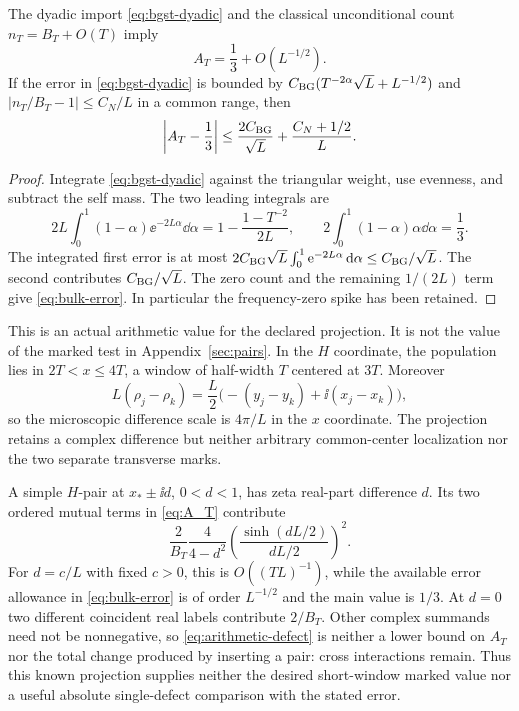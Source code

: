 \begin{proposition}\label{prop:bulk-value}
The dyadic import \eqref{eq:bgst-dyadic} and the classical
unconditional count $n_T=B_T+O(T)$ imply
\begin{equation}\label{eq:bulk-value}
 A_T=\frac13+O(L^{-1/2}).
\end{equation}
If the error in \eqref{eq:bgst-dyadic} is bounded by
$C_{\rm BG}(T^{-2\alpha}\sqrt L+L^{-1/2})$ and
$|n_T/B_T-1|\le C_N/L$ in a common range, then
\begin{equation}\label{eq:bulk-error}
 \left|A_T-\frac13\right|
 \le\frac{2C_{\rm BG}}{\sqrt L}+\frac{C_N+1/2}{L}.
\end{equation}
\end{proposition}
\begin{proof}
Integrate \eqref{eq:bgst-dyadic} against the triangular weight,
use evenness, and subtract the self mass. The two leading integrals
are
\[
 2L\int_0^1(1-\alpha)\ee^{-2L\alpha}\dd\alpha
       =1-\frac{1-T^{-2}}{2L},\qquad
 2\int_0^1(1-\alpha)\alpha\dd\alpha=\frac13.
\]
The integrated first error is at most
$2C_{\rm BG}\sqrt L\int_0^1\mathrm e^{-2L\alpha}\,\mathrm d\alpha
\le C_{\rm BG}/\sqrt L$.
The second contributes $C_{\rm BG}/\sqrt L$.
The zero count and the remaining $1/(2L)$ term give
\eqref{eq:bulk-error}. In particular the frequency-zero spike
has been retained.
\end{proof}

This is an actual arithmetic value for the declared projection.
It is not the value of the marked test in Appendix~\ref{sec:pairs}.
In the $H$ coordinate, the population lies in $2T<x\le4T$,
a window of half-width $T$ centered at $3T$.
Moreover
\[
 L(\rho_j-\rho_k)=
 \frac L2\bigl(-(y_j-y_k)+\ii(x_j-x_k)\bigr),
\]
so the microscopic difference scale is $4\pi/L$ in the $x$
coordinate. The projection retains a complex difference but
neither arbitrary common-center localization nor the two
separate transverse marks.

A simple $H$-pair at $x_*\pm\ii d$, $0<d<1$, has zeta
real-part difference $d$. Its two ordered mutual terms in
\eqref{eq:A_T} contribute
\begin{equation}\label{eq:arithmetic-defect}
 \frac2{B_T}\frac4{4-d^2}
       \left(\frac{\sinh(dL/2)}{dL/2}\right)^2 .
\end{equation}
For $d=c/L$ with fixed $c>0$, this is $O((TL)^{-1})$,
while the available error allowance in \eqref{eq:bulk-error}
is of order $L^{-1/2}$ and the main value is $1/3$.
At $d=0$ two different coincident real labels contribute $2/B_T$.
Other complex summands need not be nonnegative, so
\eqref{eq:arithmetic-defect} is neither a lower bound on $A_T$
nor the total change produced by inserting a pair: cross
interactions remain.
Thus this known projection supplies neither the desired
short-window marked value nor a useful absolute single-defect
comparison with the stated error.


